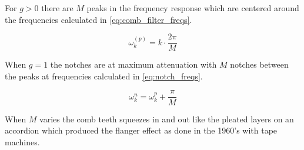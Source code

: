 For $g>0$ there are $M$ peaks in the frequency response which are centered around the frequencies calculated in \autoref{eq:comb_filter_freqs}.

\begin{equation}
\omega_{k}^{(p)}=k\cdot \frac{2\pi}{M}
\label{eq:comb_filter_freqs}
\end{equation}

\startexplain
{}
\stopexplain

When $g =1$ the notches are at maximum attenuation with $M$ notches between the peaks at frequencies calculated in \autoref{eq:notch_freqs}.

\begin{equation}\label{eq:notch_freqs}
	\omega_k^{n}=\omega_k^{p}+\frac{\pi}{M}
\end{equation}

When $M$ varies the comb teeth squeezes in and out like the pleated layers on an accordion which produced the flanger effect as done in the 1960's with tape machines. \citep{flanger_descr}
